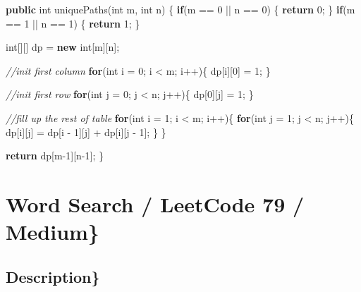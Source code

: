 \documentclass[]{book}
\newenvironment{Shaded}{\begin{snugshade}}{\end{snugshade}}
\newcommand{\CommentTok}[1]{\textcolor[rgb]{0.56,0.35,0.01}{\textit{#1}}}
\newcommand{\DataTypeTok}[1]{\textcolor[rgb]{0.13,0.29,0.53}{#1}}
\newcommand{\DecValTok}[1]{\textcolor[rgb]{0.00,0.00,0.81}{#1}}
\newcommand{\FunctionTok}[1]{\textcolor[rgb]{0.00,0.00,0.00}{#1}}
\newcommand{\KeywordTok}[1]{\textcolor[rgb]{0.13,0.29,0.53}{\textbf{#1}}}
\newcommand{\NormalTok}[1]{#1}
\begin{document}
\begin{Shaded}
\begin{Highlighting}[]
\KeywordTok{public} \DataTypeTok{int} \FunctionTok{uniquePaths}\NormalTok{(}\DataTypeTok{int}\NormalTok{ m, }\DataTypeTok{int}\NormalTok{ n) \{}
    \KeywordTok{if}\NormalTok{(m == }\DecValTok{0}\NormalTok{ || n == }\DecValTok{0}\NormalTok{) \{}
        \KeywordTok{return} \DecValTok{0}\NormalTok{;}
\NormalTok{    \}}
    \KeywordTok{if}\NormalTok{(m == }\DecValTok{1}\NormalTok{ || n == }\DecValTok{1}\NormalTok{) \{}
        \KeywordTok{return} \DecValTok{1}\NormalTok{;}
\NormalTok{    \}}

    \DataTypeTok{int}\NormalTok{[][] dp = }\KeywordTok{new} \DataTypeTok{int}\NormalTok{[m][n];}

    \CommentTok{//init first column}
    \KeywordTok{for}\NormalTok{(}\DataTypeTok{int}\NormalTok{ i = }\DecValTok{0}\NormalTok{; i < m; i++)\{}
\NormalTok{        dp[i][}\DecValTok{0}\NormalTok{] = }\DecValTok{1}\NormalTok{;}
\NormalTok{    \}}

    \CommentTok{//init first row}
    \KeywordTok{for}\NormalTok{(}\DataTypeTok{int}\NormalTok{ j = }\DecValTok{0}\NormalTok{; j < n; j++)\{}
\NormalTok{        dp[}\DecValTok{0}\NormalTok{][j] = }\DecValTok{1}\NormalTok{;}
\NormalTok{    \}}

    \CommentTok{//fill up the rest of table}
    \KeywordTok{for}\NormalTok{(}\DataTypeTok{int}\NormalTok{ i = }\DecValTok{1}\NormalTok{; i < m; i++)\{}
        \KeywordTok{for}\NormalTok{(}\DataTypeTok{int}\NormalTok{ j = }\DecValTok{1}\NormalTok{; j < n; j++)\{}
\NormalTok{            dp[i][j] = dp[i - }\DecValTok{1}\NormalTok{][j] + dp[i][j - }\DecValTok{1}\NormalTok{];}
\NormalTok{        \}}
\NormalTok{    \}}

    \KeywordTok{return}\NormalTok{ dp[m}\DecValTok{-1}\NormalTok{][n}\DecValTok{-1}\NormalTok{];}
\NormalTok{\}}
\end{Highlighting}
\end{Shaded}

\hypertarget{word-search-leetcode-79-medium}{%
\section{Word Search / LeetCode 79 / Medium\}}\label{word-search-leetcode-79-medium}}

\hypertarget{description-47}{%
\subsection{Description\}}\label{description-47}}
\end{document}
